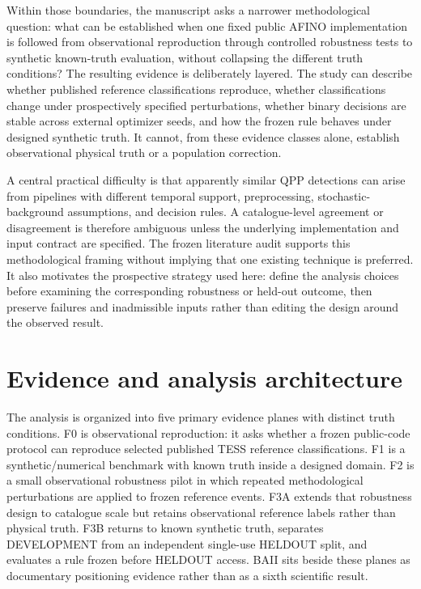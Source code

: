 \documentclass[11pt,a4paper]{article}
\begin{document}
Within those boundaries, the manuscript asks a narrower methodological question: what can be established when one fixed public AFINO implementation is followed from observational reproduction through controlled robustness tests to synthetic known-truth evaluation, without collapsing the different truth conditions? The resulting evidence is deliberately layered. The study can describe whether published reference classifications reproduce, whether classifications change under prospectively specified perturbations, whether binary decisions are stable across external optimizer seeds, and how the frozen rule behaves under designed synthetic truth. It cannot, from these evidence classes alone, establish observational physical truth or a population correction.

A central practical difficulty is that apparently similar QPP detections can arise from pipelines with different temporal support, preprocessing, stochastic-background assumptions, and decision rules. A catalogue-level agreement or disagreement is therefore ambiguous unless the underlying implementation and input contract are specified. The frozen literature audit supports this methodological framing without implying that one existing technique is preferred. It also motivates the prospective strategy used here: define the analysis choices before examining the corresponding robustness or held-out outcome, then preserve failures and inadmissible inputs rather than editing the design around the observed result.

\section{Evidence and analysis architecture}
The analysis is organized into five primary evidence planes with distinct truth conditions. F0 is observational reproduction: it asks whether a frozen public-code protocol can reproduce selected published TESS reference classifications. F1 is a synthetic/numerical benchmark with known truth inside a designed domain. F2 is a small observational robustness pilot in which repeated methodological perturbations are applied to frozen reference events. F3A extends that robustness design to catalogue scale but retains observational reference labels rather than physical truth. F3B returns to known synthetic truth, separates DEVELOPMENT from an independent single-use HELDOUT split, and evaluates a rule frozen before HELDOUT access. BAII sits beside these planes as documentary positioning evidence rather than as a sixth scientific result.
\end{document}
